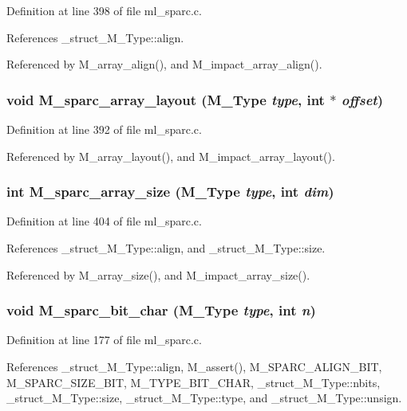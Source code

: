 Definition at line 398 of file ml\_\-sparc.c.

References \_\-struct\_\-M\_\-Type::align.

Referenced by M\_\-array\_\-align(), and M\_\-impact\_\-array\_\-align().
\subsubsection{\setlength{\rightskip}{0pt plus 5cm}void M\_\-sparc\_\-array\_\-layout (\bf{M\_\-Type} {\em type}, int $\ast$ {\em offset})}\label{ml__sparc_8c_aec7f2b5b57fc133223631daab5ea784}




Definition at line 392 of file ml\_\-sparc.c.

Referenced by M\_\-array\_\-layout(), and M\_\-impact\_\-array\_\-layout().
\subsubsection{\setlength{\rightskip}{0pt plus 5cm}int M\_\-sparc\_\-array\_\-size (\bf{M\_\-Type} {\em type}, int {\em dim})}\label{ml__sparc_8c_ff791473b06c0bc0575f73d005fce6c4}




Definition at line 404 of file ml\_\-sparc.c.

References \_\-struct\_\-M\_\-Type::align, and \_\-struct\_\-M\_\-Type::size.

Referenced by M\_\-array\_\-size(), and M\_\-impact\_\-array\_\-size().
\subsubsection{\setlength{\rightskip}{0pt plus 5cm}void M\_\-sparc\_\-bit\_\-char (\bf{M\_\-Type} {\em type}, int {\em n})}\label{ml__sparc_8c_d4e647b1c70bb56b33aa6e6827d06068}




Definition at line 177 of file ml\_\-sparc.c.

References \_\-struct\_\-M\_\-Type::align, M\_\-assert(), M\_\-SPARC\_\-ALIGN\_\-BIT, M\_\-SPARC\_\-SIZE\_\-BIT, M\_\-TYPE\_\-BIT\_\-CHAR, \_\-struct\_\-M\_\-Type::nbits, \_\-struct\_\-M\_\-Type::size, \_\-struct\_\-M\_\-Type::type, and \_\-struct\_\-M\_\-Type::unsign.

